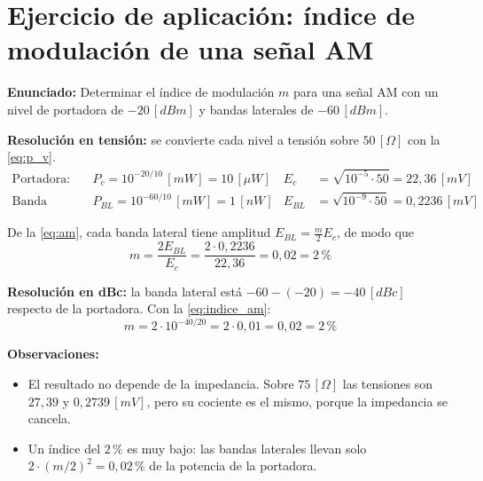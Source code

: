 \section{Ejercicio de aplicación: índice de modulación de una señal AM}
\label{sec:ejercicio_am}

\textbf{Enunciado:} Determinar el índice de modulación $m$ para una señal AM con un nivel de portadora de $-20 \, [dBm]$ y bandas laterales de $-60 \, [dBm]$.

\textbf{Resolución en tensión:} se convierte cada nivel a tensión sobre $50 \, [\Omega]$ con la \autoref{eq:p_v}.
\begin{align}
    \text{Portadora:} \quad & P_c = 10^{-20/10} \, [mW] = 10 \, [\mu W]
    & E_c &= \sqrt{10^{-5} \cdot 50} = 22{,}36 \, [mV] \\
    \text{Banda lateral:} \quad & P_{BL} = 10^{-60/10} \, [mW] = 1 \, [nW]
    & E_{BL} &= \sqrt{10^{-9} \cdot 50} = 0{,}2236 \, [mV]
\end{align}

De la \autoref{eq:am}, cada banda lateral tiene amplitud $E_{BL} = \frac{m}{2} E_c$, de modo que
\begin{equation}
    m = \frac{2 E_{BL}}{E_c} = \frac{2 \cdot 0{,}2236}{22{,}36} = 0{,}02 = 2 \,\text{\%}
\end{equation}

\textbf{Resolución en dBc:} la banda lateral está $-60 - (-20) = -40 \, [dBc]$ respecto de la portadora. Con la \autoref{eq:indice_am}:
\begin{equation}
    m = 2 \cdot 10^{-40/20} = 2 \cdot 0{,}01 = 0{,}02 = 2 \,\text{\%}
\end{equation}

\textbf{Observaciones:}
\begin{itemize}
    \item El resultado no depende de la impedancia. Sobre $75 \, [\Omega]$ las tensiones son $27{,}39$ y $0{,}2739 \, [mV]$, pero su cociente es el mismo, porque la impedancia se cancela.
    \item Un índice del $2 \,\text{\%}$ es muy bajo: las bandas laterales llevan solo $2 \cdot (m/2)^2 = 0{,}02 \,\text{\%}$ de la potencia de la portadora.
\end{itemize}
